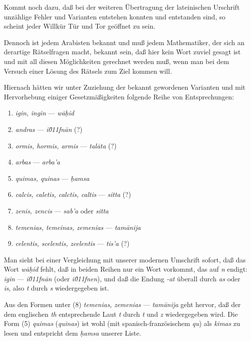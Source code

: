 \documentclass[11pt,a4paper]{article}
\begin{document}
Kommt noch dazu, da\ss{} bei der weiteren \"Ubertragung der lateinischen Urschrift unz\"ahlige Fehler und Varianten entstehen konnten und entstanden sind, so scheint jeder Willk\"ur T\"ur und Tor ge\"offnet zu sein.

Dennoch ist jedem Arabisten bekannt und mu\ss{} jedem Mathematiker, der sich an derartige R\"atselfragen macht, bekannt sein, da\ss{} hier kein Wort zuviel gesagt ist und mit all diesen M\"oglichkeiten gerechnet werden mu\ss{}, wenn man bei dem Versuch einer L\"osung des R\"atsels zum Ziel kommen will.

Hiernach h\"atten wir unter Zuziehung der bekannt gewordenen Varianten und mit Hervorhebung einiger Gesetzm\"a\ss{}igkeiten folgende Reihe von Entsprechungen:
\begin{enumerate}
\item[(1)] \textit{igin, ingin} --- \textit{w\=a\d{h}id}
\item[(2)] \textit{andras} --- \textit{i\u011fn\=an} (?)
\item[(3)] \textit{ormis, hormis, armis} --- \textit{tal\=ata} (?)
\item[(4)] \textit{arbas} --- \textit{arba'a}
\item[(5)] \textit{quimas, quinas} --- \textit{\d{h}amsa}
\item[(6)] \textit{calcis, caletis, calctis, caltis} --- \textit{sitta} (?)
\item[(7)] \textit{zenis, zencis} --- \textit{sab'a} oder \textit{sitta}
\item[(8)] \textit{temenias, temeinas, zemenias} --- \textit{tam\=anija}
\item[(9)] \textit{celentis, scelentis, zcelentis} --- \textit{tis'a} (?)
\end{enumerate}

Man sieht bei einer Vergleichung mit unserer modernen Umschrift sofort, da\ss{} das Wort \textit{w\=a\d{h}id} fehlt, da\ss{} in beiden Reihen nur ein Wort vorkommt, das auf \textit{n} endigt: \textit{igin} --- \textit{i\u011fn\=an} (oder \textit{i\u011fnen}), und da\ss{} die Endung \textit{-at} \"uberall durch \textit{as} oder \textit{is}, also \textit{t} durch \textit{s} wiedergegeben ist.

Aus den Formen unter (8) \textit{temenias, zemenias} --- \textit{tam\=anija} geht hervor, da\ss{} der dem englischen \textit{th} entsprechende Laut \textit{t} durch \textit{t} und \textit{z} wiedergegeben wird. Die Form (5) \textit{quimas} (\textit{quinas}) ist wohl (mit spanisch-franz\"osischem \textit{qu}) als \textit{kimas} zu lesen und entspricht dem \textit{\d{h}amsa} unserer Liste.
\end{document}
